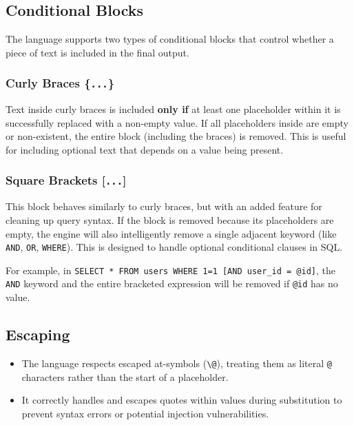 \subsection{Conditional Blocks}

The language supports two types of conditional blocks that control whether a piece of text is included in the final output.

\subsubsection{Curly Braces \{\texttt{...}\}}

Text inside curly braces is included \textbf{only if} at least one placeholder within it is successfully replaced with a non-empty value. If all placeholders inside are empty or non-existent, the entire block (including the braces) is removed. This is useful for including optional text that depends on a value being present.

\subsubsection{Square Brackets [\texttt{...}]}

This block behaves similarly to curly braces, but with an added feature for cleaning up query syntax. If the block is removed because its placeholders are empty, the engine will also intelligently remove a single adjacent keyword (like \texttt{AND}, \texttt{OR}, \texttt{WHERE}). This is designed to handle optional conditional clauses in SQL.

For example, in \texttt{SELECT * FROM users WHERE 1=1 [AND user\_id = @id]}, the \texttt{AND} keyword and the entire bracketed expression will be removed if \texttt{@id} has no value.

\subsection{Escaping}

\begin{itemize}
\item The language respects escaped at-symbols (\texttt{\textbackslash @}), treating them as literal \texttt{@} characters rather than the start of a placeholder.
\item It correctly handles and escapes quotes within values during substitution to prevent syntax errors or potential injection vulnerabilities.
\end{itemize}

